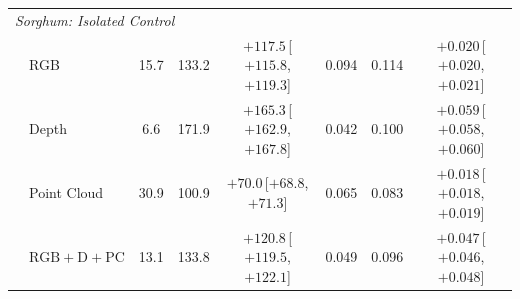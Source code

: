 \documentclass[10pt,twocolumn,letterpaper]{article}
\begin{document}
\begin{table}[t]
\begin{tabular}{l l ccc ccc}
    \midrule
    \multicolumn{8}{l}{\emph{Sorghum: Isolated Control}} \\
    & RGB & 15.7 & 133.2 & $+117.5$\,{\scriptsize[$+115.8$, $+119.3$]} & 0.094 & 0.114 & $+0.020$\,{\scriptsize[$+0.020$, $+0.021$]} \\
    & Depth & 6.6 & 171.9 & $+165.3$\,{\scriptsize[$+162.9$, $+167.8$]} & 0.042 & 0.100 & $+0.059$\,{\scriptsize[$+0.058$, $+0.060$]} \\
    & Point Cloud & 30.9 & 100.9 & $+70.0$\,{\scriptsize[$+68.8$, $+71.3$]} & 0.065 & 0.083 & $+0.018$\,{\scriptsize[$+0.018$, $+0.019$]} \\
    & $\mathrm{RGB}+\mathrm{D}+\mathrm{PC}$ & 13.1 & 133.8 & $+120.8$\,{\scriptsize[$+119.5$, $+122.1$]} & 0.049 & 0.096 & $+0.047$\,{\scriptsize[$+0.046$, $+0.048$]} \\
    \bottomrule
  \end{tabular}
\end{table}
\end{document}
